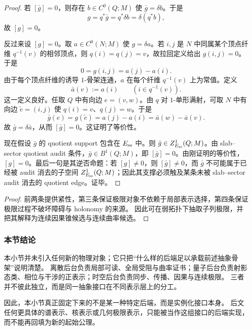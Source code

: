 \begin{proof}
若 \([\bar g]=0\)，则存在 \(b\in C^0(Q;M)\) 使 \(\bar g=\delta b\)。于是
\[
g=q^\ast\bar g=q^\ast\delta b=\delta(q^\ast b),
\]
故 \([g]=0\)。

反过来设 \([g]=0\)。取 \(a\in C^0(N;M)\) 使 \(g=\delta a\)。若 \(i,j\) 是 \(N\) 中同属某个顶点纤维 \(q^{-1}(v)\) 的相邻顶点，则 \(q(i)=q(j)=v\)，故拉回定义给出 \(g(i,j)=0\)。于是
\[
0=g(i,j)=a(j)-a(i).
\]
由于每个顶点纤维的诱导 \(1\)-骨架连通，\(a\) 在每个纤维 \(q^{-1}(v)\) 上为常值。定义
\[
\bar a(v):=a(i)\qquad (i\in q^{-1}(v)).
\]
这一定义良好。任取 \(Q\) 中有向边 \(e=(v,w)\)。由 \(q\) 对 \(1\)-单形满射，可取 \(N\) 中有向边 \(\tilde e=(i,j)\) 使 \(q(i)=v\)、\(q(j)=w\)。于是
\[
\bar g(e)=g(\tilde e)=a(j)-a(i)=\bar a(w)-\bar a(v).
\]
故 \(\bar g=\delta\bar a\)，从而 \([\bar g]=0\)。这证明了等价性。

现在假设 \(\bar g\) 的 quotient support 包含在 \(E_{\rm ss}\) 中。则 \(\bar g\in Z^1_{E_{\rm ss}}(Q;M)\)。由 slab--sector quotient audit 条件，\(\bar g\in B^1(Q;M)\)，即 \([\bar g]=0\)。由刚证明的等价性，\([g]=0\)。最后一句是其逆否命题：若 \([g]\ne0\)，则 \([\bar g]\ne0\)，而 \(\bar g\) 不可能属于已经被 audit 消去的子空间 \(Z^1_{E_{\rm ss}}(Q;M)\)；因此其支撑必须触及某条未被 slab--sector audit 消去的 quotient edge。证毕。
\end{proof}

\begin{proof}
前两条提供紧性，第三条保证极限对象不依赖于局部表示选择，第四条保证极限过程不破坏障碍与 holonomy 的来源。
因此可在弱拓扑下抽取子列极限，并把其解释为连续因果锥候选与连续曲率候选。
\end{proof}

\subsubsection{本节结论}
本小节并未引入任何新的物理对象；它只把“什么样的后端足以承载前述抽象骨架”说明清楚。
离散后台负责局部可读、全局受阻与曲率证书；量子后台负责射影态类、相位与干涉的正表示；时空后台负责同步、传播、因果与连续极限。
三者并不彼此独立，而是同一抽象接口在不同表示层上的分工。

因此，本小节真正固定下来的不是某一种特定后端，而是实例化接口本身。
后文任何更具体的谱表示、核表示或几何极限表示，只能被当作这组接口的后端实现，而不能再回填为新的起始公理。
